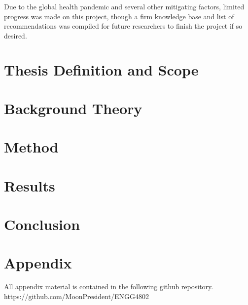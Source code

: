 \documentclass[a4paper,12pt]{report}
\begin{document}
	Due to the global health pandemic and several other mitigating factors, limited progress was made on this project, though a firm knowledge base and list of recommendations was compiled for future researchers to finish the project if so desired.

	\leavevmode\thispagestyle{empty}\newpage
	
	\thispagestyle{empty}
	\tableofcontents
	\thispagestyle{empty}
	\listoffigures
	\thispagestyle{empty}
	\leavevmode\thispagestyle{empty}\newpage
	
	\leavevmode\thispagestyle{empty}\newpage
	
	\cleardoublepage{}
	
	
	\chapter{Thesis Definition and Scope}
	

	\leavevmode\thispagestyle{empty}\newpage
	\leavevmode\thispagestyle{empty}\newpage

	\chapter{Background Theory}
	
	
	
	\leavevmode\thispagestyle{empty}\newpage
	
	\leavevmode\thispagestyle{empty}\newpage
	
	\chapter{Method}
	
	
	\chapter{Results}
	
	
	\chapter{Conclusion}
	
	
	\appendix
	\chapter{Appendix}
	All appendix material is contained in the following github repository.
	https://github.com/MoonPresident/ENGG4802
%	

	\printbibliography
\end{document}
